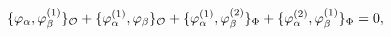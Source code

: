\begin{equation}
\label{first-order} \{\varphi_\alpha, \varphi^{(1)}_\beta\}_{\cal
O} +\{\varphi^{(1)}_\alpha, \varphi_\beta\}_{\cal O}
+\{\varphi^{(1)}_\alpha, \varphi^{(2)}_\beta\}_{\Phi}
+\{\varphi^{(2)}_\alpha, \varphi^{(1)}_\beta\}_{\Phi}=0,
\end{equation}

